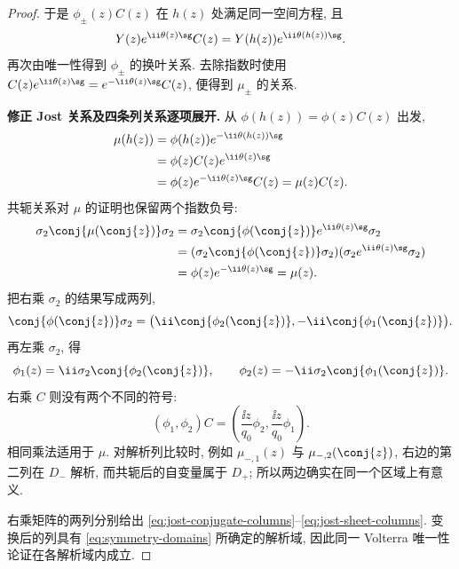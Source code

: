 \begin{proof}
于是 $\phi_\pm(z)C(z)$ 在 $h(z)$ 处满足同一空间方程, 且
\[
Y(z)e^{\ii\theta(z)\sg}C(z)
=Y(h(z))e^{\ii\theta(h(z))\sg}.
\]
再次由唯一性得到 $\phi_\pm$ 的换叶关系. 去除指数时使用
$C(z)e^{\ii\theta(z)\sg}=e^{-\ii\theta(z)\sg}C(z)$,
便得到 $\mu_\pm$ 的关系. 
\par\medskip\noindent\textbf{修正 Jost 关系及四条列关系逐项展开.}\quad 
从 $\phi(h(z))=\phi(z)C(z)$ 出发,
\begin{align*}
\mu(h(z))
&=\phi(h(z))e^{-\ii\theta(h(z))\sg}\\
&=\phi(z)C(z)e^{\ii\theta(z)\sg}\\
&=\phi(z)e^{-\ii\theta(z)\sg}C(z)=\mu(z)C(z).
\end{align*}
共轭关系对 $\mu$ 的证明也保留两个指数负号:
\begin{align*}
\sigma_2\conj{\mu(\conj{z})}\sigma_2
&=\sigma_2\conj{\phi(\conj{z})}
 e^{\ii\theta(z)\sg}\sigma_2\\
&=(\sigma_2\conj{\phi(\conj{z})}\sigma_2)
 (\sigma_2 e^{\ii\theta(z)\sg}\sigma_2)\\
&=\phi(z)e^{-\ii\theta(z)\sg}=\mu(z).
\end{align*}
把右乘 $\sigma_2$ 的结果写成两列,
\[
\conj{\phi(\conj{z})}\sigma_2
=\bigl(\ii\conj{\phi_2(\conj{z})},
-\ii\conj{\phi_1(\conj{z})}\bigr).
\]
再左乘 $\sigma_2$, 得
\[
\phi_1(z)=\ii\sigma_2\conj{\phi_2(\conj{z})},
\qquad
\phi_2(z)=-\ii\sigma_2\conj{\phi_1(\conj{z})}.
\]
右乘 $C$ 则没有两个不同的符号:
\[
(\phi_1,\phi_2)C
=\left(\dfrac{\ii z}{q_0}\phi_2,
\dfrac{\ii z}{q_0}\phi_1\right).
\]
相同乘法适用于 $\mu$.
对解析列比较时, 例如
$\mu_{-,1}(z)$ 与 $\mu_{-,2}(\conj{z})$,
右边的第二列在 $D_-$ 解析, 而共轭后的自变量属于 $D_+$;
所以两边确实在同一个区域上有意义.

右乘矩阵的两列分别给出 \eqref{eq:jost-conjugate-columns}--\eqref{eq:jost-sheet-columns}. 变换后的列具有 \eqref{eq:symmetry-domains} 所确定的解析域, 因此同一 Volterra 唯一性论证在各解析域内成立.
\end{proof}

